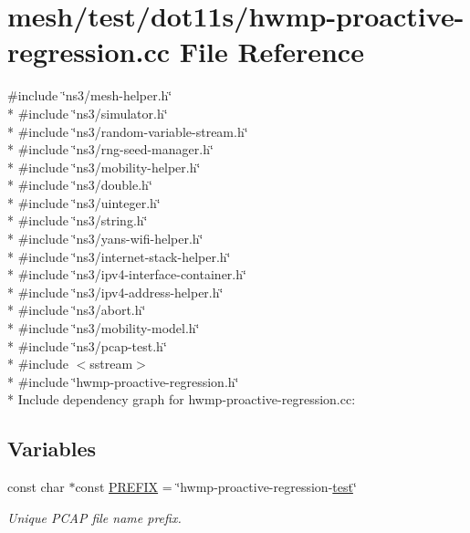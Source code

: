 \hypertarget{hwmp-proactive-regression_8cc}{}\section{mesh/test/dot11s/hwmp-\/proactive-\/regression.cc File Reference}
\label{hwmp-proactive-regression_8cc}
{\ttfamily \#include \char`\"{}ns3/mesh-\/helper.\+h\char`\"{}}\\*
{\ttfamily \#include \char`\"{}ns3/simulator.\+h\char`\"{}}\\*
{\ttfamily \#include \char`\"{}ns3/random-\/variable-\/stream.\+h\char`\"{}}\\*
{\ttfamily \#include \char`\"{}ns3/rng-\/seed-\/manager.\+h\char`\"{}}\\*
{\ttfamily \#include \char`\"{}ns3/mobility-\/helper.\+h\char`\"{}}\\*
{\ttfamily \#include \char`\"{}ns3/double.\+h\char`\"{}}\\*
{\ttfamily \#include \char`\"{}ns3/uinteger.\+h\char`\"{}}\\*
{\ttfamily \#include \char`\"{}ns3/string.\+h\char`\"{}}\\*
{\ttfamily \#include \char`\"{}ns3/yans-\/wifi-\/helper.\+h\char`\"{}}\\*
{\ttfamily \#include \char`\"{}ns3/internet-\/stack-\/helper.\+h\char`\"{}}\\*
{\ttfamily \#include \char`\"{}ns3/ipv4-\/interface-\/container.\+h\char`\"{}}\\*
{\ttfamily \#include \char`\"{}ns3/ipv4-\/address-\/helper.\+h\char`\"{}}\\*
{\ttfamily \#include \char`\"{}ns3/abort.\+h\char`\"{}}\\*
{\ttfamily \#include \char`\"{}ns3/mobility-\/model.\+h\char`\"{}}\\*
{\ttfamily \#include \char`\"{}ns3/pcap-\/test.\+h\char`\"{}}\\*
{\ttfamily \#include $<$sstream$>$}\\*
{\ttfamily \#include \char`\"{}hwmp-\/proactive-\/regression.\+h\char`\"{}}\\*
Include dependency graph for hwmp-\/proactive-\/regression.cc\+:
\subsection*{Variables}
\begin{DoxyCompactItemize}
\item 
const char $\ast$const \hyperlink{hwmp-proactive-regression_8cc_a61dc66981fa47bfd0066a57a487c599c}{P\+R\+E\+F\+IX} = \char`\"{}hwmp-\/proactive-\/regression-\/\hyperlink{main-test-sync_8cc_a708a4c1a4d0c4acc4c447310dd4db27f}{test}\char`\"{}
\begin{DoxyCompactList}\small\item\em Unique P\+C\+AP file name prefix. \end{DoxyCompactList}\end{DoxyCompactItemize}


